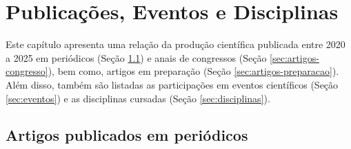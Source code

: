 \chapter{Publicações, Eventos e Disciplinas}
\label{cap:publicacoes}

\begin{overview}
  Este capítulo apresenta uma relação da produção científica publicada entre 2020 a 2025 em periódicos (Seção \ref{sec:artigos-periodicos}) e anais de congressos (Seção \ref{sec:artigos-congresso}), bem como, artigos em preparação (Seção \ref{sec:artigos-preparacao}).
  Além disso, também são listadas as participações em eventos científicos (Seção \ref{sec:eventos}) e as disciplinas cursadas  (Seção \ref{sec:disciplinas}).
\end{overview}

\section{Artigos publicados em periódicos}
\label{sec:artigos-periodicos}
